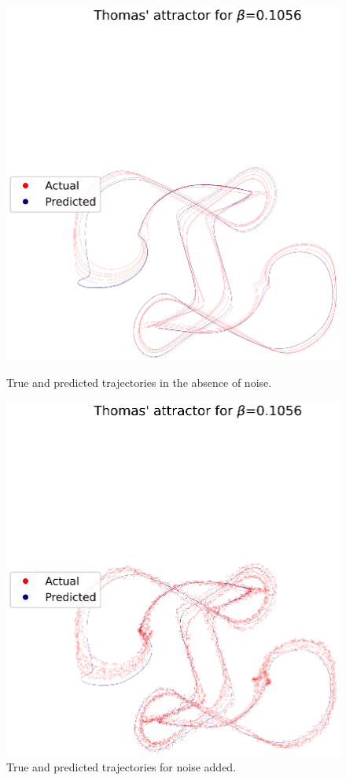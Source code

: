 \documentclass[a4paper,12pt,twoside]{report}
\begin{document}
\begin{figure}[ht]
  \centering
    \centering
    \includegraphics[width=\linewidth]{_Thomas_nonoise.eps}
    \caption*{True and predicted trajectories in the absence of noise.}
  \endminipage\hfill
    \centering
    \includegraphics[width=\linewidth]{_ThomasNoisy.eps}
    \caption*{True and predicted trajectories for noise added.}
  \endminipage
\end{figure}
\end{document}
